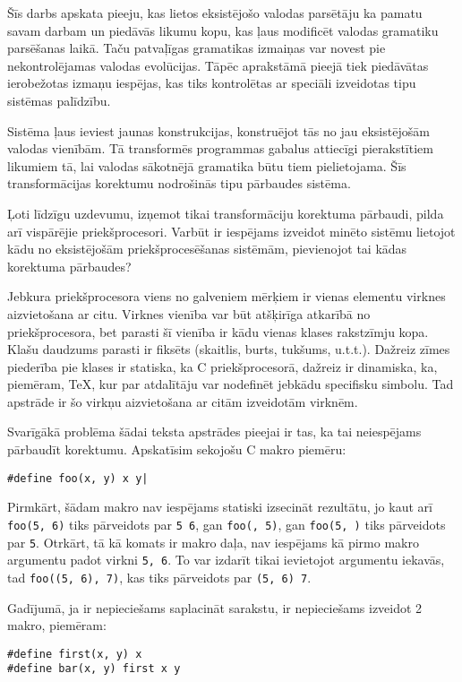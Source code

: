 Šīs darbs apskata pieeju, kas lietos eksistējošo valodas parsētāju ka pamatu savam darbam un piedāvās likumu kopu, kas ļaus  modificēt valodas gramatiku parsēšanas laikā. Taču patvaļīgas gramatikas izmaiņas var novest pie nekontrolējamas valodas evolūcijas. Tāpēc aprakstāmā pieejā tiek piedāvātas ierobežotas izmaņu iespējas, kas tiks kontrolētas ar speciāli izveidotas tipu sistēmas palīdzību.

Sistēma ļaus ieviest jaunas konstrukcijas, konstruējot tās no jau eksistējošām valodas vienībām. Tā transformēs programmas gabalus attiecīgi pierakstītiem likumiem tā, lai valodas sākotnējā gramatika būtu tiem pielietojama. Šīs transformācijas korektumu nodrošinās tipu pārbaudes sistēma.

Ļoti līdzīgu uzdevumu, izņemot tikai transformāciju korektuma pārbaudi, pilda arī vispārējie priekšprocesori. Varbūt ir iespējams izveidot minēto sistēmu lietojot kādu no eksistējošām priekšprocesēšanas sistēmām, pievienojot tai kādas korektuma pārbaudes?

Jebkura priekšprocesora viens no galveniem mērķiem ir vienas elementu virknes aizvietošana ar citu. Virknes vienība var būt atšķirīga atkarībā no priekšprocesora, bet parasti šī vienība ir kādu vienas klases rakstzīmju kopa. Klašu daudzums parasti ir fiksēts (skaitlis, burts, tukšums, u.t.t.). Dažreiz zīmes piederība pie klases ir statiska, ka C priekšprocesorā, dažreiz ir dinamiska, ka, piemēram, \TeX{}, kur par atdalītāju var nodefinēt jebkādu specifisku simbolu. Tad apstrāde ir šo virkņu aizvietošana ar citām izveidotām virknēm.

Svarīgākā problēma šādai teksta apstrādes pieejai ir tas, ka tai neiespējams pārbaudīt korektumu. Apskatīsim sekojošu C makro piemēru:
\begin{verbatim}
#define foo(x, y) x y|
\end{verbatim}

Pirmkārt, šādam makro nav iespējams statiski izsecināt rezultātu, jo kaut arī \verb|foo(5, 6)| tiks pārveidots par \verb|5 6|, gan \verb|foo(, 5)|, gan \verb|foo(5, )| tiks pārveidots par \verb|5|. Otrkārt, tā kā komats ir makro daļa, nav iespējams kā pirmo makro argumentu padot virkni \verb|5, 6|. To var izdarīt tikai ievietojot argumentu iekavās, tad \verb|foo((5, 6), 7)|, kas tiks pārveidots par \verb|(5, 6) 7|.

Gadījumā, ja ir nepieciešams saplacināt sarakstu, ir nepieciešams izveidot 2 makro, piemēram:
\begin{verbatim}
#define first(x, y) x
#define bar(x, y) first x y
\end{verbatim}

